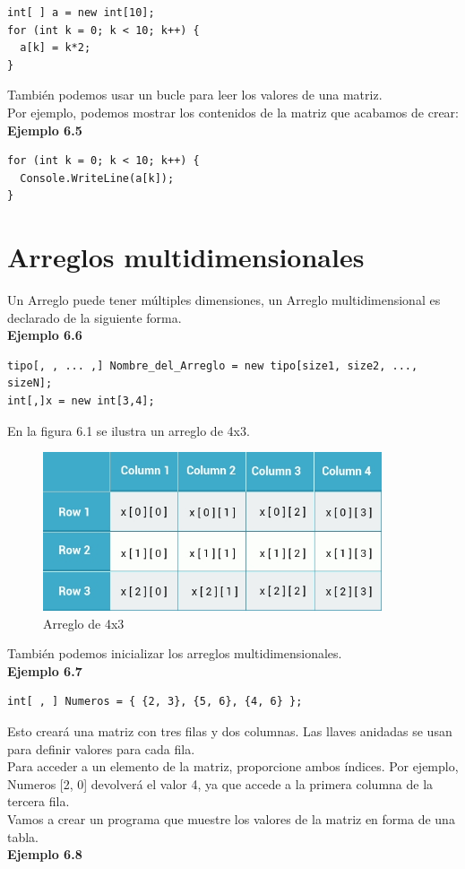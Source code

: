 \documentclass[12pt,a4paper]{report}
\begin{document}
\begin{lstlisting}
int[ ] a = new int[10];
for (int k = 0; k < 10; k++) {
  a[k] = k*2;
}
\end{lstlisting}También podemos usar un bucle para leer los valores de una matriz.\\Por ejemplo, podemos mostrar los contenidos de la matriz que acabamos de crear:\\\textbf{Ejemplo 6.5}
\begin{lstlisting}
for (int k = 0; k < 10; k++) {
  Console.WriteLine(a[k]);
}
\end{lstlisting}
\section{Arreglos multidimensionales}
Un Arreglo puede tener múltiples dimensiones, un Arreglo multidimensional es declarado de la siguiente forma.\\\textbf{Ejemplo 6.6}
\begin{lstlisting}
tipo[, , ... ,] Nombre_del_Arreglo = new tipo[size1, size2, ..., sizeN];
int[,]x = new int[3,4];
\end{lstlisting}En la figura 6.1 se ilustra un arreglo de 4x3.
\begin{figure}[hbtp]
\centering
\includegraphics[width=10cm]{Csh_Imagenes/array.jpg}
\caption{Arreglo de 4x3}
\end{figure}También podemos inicializar los arreglos multidimensionales.\\\textbf{Ejemplo 6.7}
\begin{lstlisting}
int[ , ] Numeros = { {2, 3}, {5, 6}, {4, 6} }; 
\end{lstlisting}Esto creará una matriz con tres filas y dos columnas. Las llaves anidadas se usan para definir valores para cada fila.\\Para acceder a un elemento de la matriz, proporcione ambos índices. Por ejemplo, Numeros [2, 0] devolverá el valor 4, ya que accede a la primera columna de la tercera fila.\\Vamos a crear un programa que muestre los valores de la matriz en forma de una tabla.\\\textbf{Ejemplo 6.8}
\end{document}
